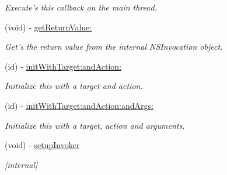 \begin{DoxyCompactItemize}
\begin{DoxyCompactList}\small\item\em Execute's this callback on the main thread. \item\end{DoxyCompactList}\item 
(void) -\/ \hyperlink{interface_g_d_callback_ae28d4341944ea3135a41d16039bfc6f9}{getReturnValue:}
\begin{DoxyCompactList}\small\item\em Get's the return value from the internal NSInvocation object. \item\end{DoxyCompactList}\item 
(id) -\/ \hyperlink{interface_g_d_callback_a7109227882adc61abf44c14e2b2064c4}{initWithTarget:andAction:}
\begin{DoxyCompactList}\small\item\em Initialize this with a target and action. \item\end{DoxyCompactList}\item 
(id) -\/ \hyperlink{interface_g_d_callback_a733709d0c0a9d9506a46a24b240ac51c}{initWithTarget:andAction:andArgs:}
\begin{DoxyCompactList}\small\item\em Initialize this with a target, action and arguments. \item\end{DoxyCompactList}\item 
\hypertarget{interface_g_d_callback_a0df25513490a2d52916fb51a96e3313d}{
(void) -\/ \hyperlink{interface_g_d_callback_a0df25513490a2d52916fb51a96e3313d}{setupInvoker}}
\label{interface_g_d_callback_a0df25513490a2d52916fb51a96e3313d}

\begin{DoxyCompactList}\small\item\em \mbox{[}internal\mbox{]} \item\end{DoxyCompactList}\end{DoxyCompactItemize}
